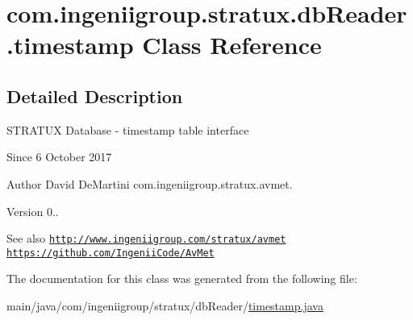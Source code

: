 \hypertarget{classcom_1_1ingeniigroup_1_1stratux_1_1db_reader_1_1timestamp}{}\section{com.\+ingeniigroup.\+stratux.\+db\+Reader.\+timestamp Class Reference}
\label{classcom_1_1ingeniigroup_1_1stratux_1_1db_reader_1_1timestamp}


\subsection{Detailed Description}
S\+T\+R\+A\+T\+UX Database -\/ timestamp table interface

\begin{DoxySince}{Since}
6 October 2017 
\end{DoxySince}
\begin{DoxyAuthor}{Author}
David De\+Martini  com.\+ingeniigroup.\+stratux.\+avmet. 
\end{DoxyAuthor}
\begin{DoxyVersion}{Version}
0.. 
\end{DoxyVersion}
\begin{DoxySeeAlso}{See also}
\href{http://www.ingeniigroup.com/stratux/avmet}{\tt http\+://www.\+ingeniigroup.\+com/stratux/avmet}  \href{https://github.com/IngeniiCode/AvMet}{\tt https\+://github.\+com/\+Ingenii\+Code/\+Av\+Met} 
\end{DoxySeeAlso}


The documentation for this class was generated from the following file\+:\begin{DoxyCompactItemize}
\item 
main/java/com/ingeniigroup/stratux/db\+Reader/\hyperlink{timestamp_8java}{timestamp.\+java}\end{DoxyCompactItemize}
